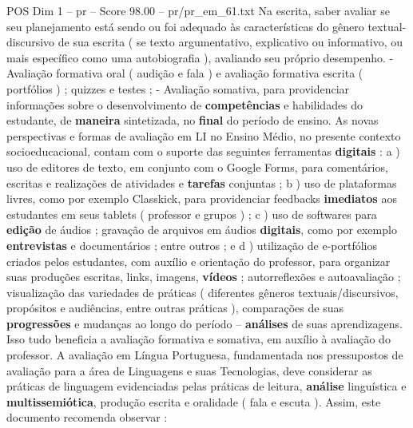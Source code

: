 \begin{textsample}{POS Dim 1 – pr – Score 98.00 – pr/pr\_em\_61.txt}
Na escrita, saber avaliar se seu planejamento está sendo ou foi adequado às características do gênero textual-discursivo de sua escrita ( se texto argumentativo, explicativo ou informativo, ou mais específico como uma autobiografia ), avaliando seu próprio desempenho. - Avaliação formativa oral ( audição e fala ) e avaliação formativa escrita ( portfólios ) ; quizzes e testes ; - Avaliação somativa, para providenciar informações sobre o desenvolvimento de \textbf{competências} e habilidades do estudante, de \textbf{maneira} sintetizada, no \textbf{final} do período de ensino.
As novas perspectivas e formas de avaliação em LI no Ensino Médio, no presente contexto socioeducacional, contam com o suporte das seguintes ferramentas \textbf{digitais} : a ) uso de editores de texto, em conjunto com o Google Forms, para comentários, escritas e realizações de atividades e \textbf{tarefas} conjuntas ; b ) uso de plataformas livres, como por exemplo Classkick, para providenciar feedbacks \textbf{imediatos} aos estudantes em seus tablets ( professor e grupos ) ; c ) uso de softwares para \textbf{edição} de áudios ; gravação de arquivos em áudios \textbf{digitais}, como por exemplo \textbf{entrevistas} e documentários ; entre outros ; e d ) utilização de e-portfólios criados pelos estudantes, com auxílio e orientação do professor, para organizar suas produções escritas, links, imagens, \textbf{vídeos} ; autorreflexões e autoavaliação ; visualização das variedades de práticas ( diferentes gêneros textuais/discursivos, propósitos e audiências, entre outras práticas ), comparações de suas \textbf{progressões} e mudanças ao longo do período – \textbf{análises} de suas aprendizagens.
Isso tudo beneficia a avaliação formativa e somativa, em auxílio à avaliação do professor.
A avaliação em Língua Portuguesa, fundamentada nos pressupostos de avaliação para a área de Linguagens e suas Tecnologias, deve considerar as práticas de linguagem evidenciadas pelas práticas de leitura, \textbf{análise} linguística e \textbf{multissemiótica}, produção escrita e oralidade ( fala e escuta ).
Assim, este documento recomenda observar :

\end{textsample}
